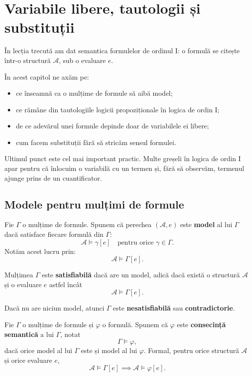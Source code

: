 \chapter{Variabile libere, tautologii și substituții}

În lecția trecută am dat semantica formulelor de ordinul I: o formulă se citește într-o structură \( \mathcal{A} \), sub o evaluare \(e\).

În acest capitol ne axăm pe:
\begin{itemize}
	\item ce înseamnă ca o mulțime de formule să aibă model;
	\item ce rămâne din tautologiile logicii propoziționale în logica de ordin I;
	\item de ce adevărul unei formule depinde doar de variabilele ei libere;
	\item cum facem substituții fără să stricăm sensul formulei.
\end{itemize}

Ultimul punct este cel mai important practic. Multe greșeli în logica de ordin I apar pentru că înlocuim o variabilă cu un termen și, fără să observăm, termenul ajunge prins de un cuantificator.

\section{Modele pentru mulțimi de formule}

\begin{definition}
	Fie \( \Gamma \) o mulțime de formule. Spunem că perechea \( (\mathcal{A}, e) \) este \textbf{model} al lui \( \Gamma \) dacă satisface fiecare formulă din \( \Gamma \):
	\[
		\mathcal{A} \models \gamma[e]
		\quad \text{pentru orice } \gamma \in \Gamma.
	\]
	Notăm acest lucru prin:
	\[
		\mathcal{A} \models \Gamma[e].
	\]
\end{definition}

\begin{note}
	Mulțimea \( \Gamma \) este \textbf{satisfiabilă} dacă are un model, adică dacă există o structură \( \mathcal{A} \) și o evaluare \(e\) astfel încât
	\[
		\mathcal{A} \models \Gamma[e].
	\]

	Dacă nu are niciun model, atunci \( \Gamma \) este \textbf{nesatisfiabilă} sau \textbf{contradictorie}.
\end{note}


\begin{note}
	Fie \( \Gamma \) o mulțime de formule și \( \varphi \) o formulă. Spunem că \( \varphi \) este \textbf{consecință semantică} a lui \( \Gamma \), notat
	\[
		\Gamma \models \varphi,
	\]
	dacă orice model al lui \( \Gamma \) este și model al lui \( \varphi \). Formal, pentru orice structură \( \mathcal{A} \) și orice evaluare \(e\),
	\[
		\mathcal{A} \models \Gamma[e]
		\implies
		\mathcal{A} \models \varphi[e].
	\]
\end{note}

